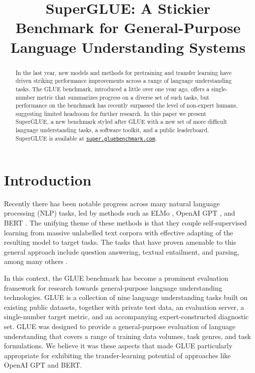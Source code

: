 \title{SuperGLUE: A Stickier Benchmark for General-Purpose Language Understanding Systems}



\maketitle

\begin{abstract}

In the last year, new models and methods for pretraining and transfer learning have driven striking performance improvements across a range of language understanding tasks. The GLUE benchmark, introduced a little over one year ago, offers a single-number metric that summarizes progress on a diverse set of such tasks, but performance on the benchmark has recently surpassed the level of non-expert humans, suggesting limited headroom for further research. In this paper we present SuperGLUE, a new benchmark styled after GLUE with a new set of more difficult language understanding tasks, a software toolkit, and a public leaderboard.
SuperGLUE is available at \href{https://super.gluebenchmark.com/}{\tt super.gluebenchmark.com}.

\end{abstract}

\section{Introduction}

Recently there has been notable progress across many natural language processing (NLP) tasks, led by methods such as ELMo \citep{peters2018deep}, OpenAI GPT \citep{radford2018improving}, and BERT \citep{devlin2018bert}. The unifying theme of these methods is that they couple self-supervised learning from massive unlabelled text corpora with effective adapting of the resulting model to target tasks. The tasks that have proven amenable to this general approach include question answering, textual entailment, and parsing, among many others \citep[][i.a.]{devlin2018bert,kitaev2018multilingual}. 

In this context, the GLUE benchmark \citep{wang2018glue} has become a prominent evaluation framework for research towards general-purpose language understanding technologies. 
GLUE is a collection of nine language understanding tasks built on existing public datasets, together with private test data, an evaluation server, a single-number target metric, and an accompanying expert-constructed diagnostic set. GLUE was designed to provide a general-purpose evaluation of language understanding that covers a range of training data volumes, task genres, and task formulations. We believe it was these aspects that made GLUE particularly appropriate for exhibiting the transfer-learning potential of approaches like OpenAI GPT and BERT.

